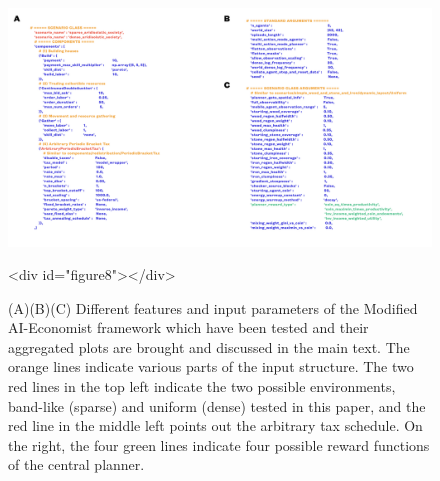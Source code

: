 \documentclass{article}
\begin{document}
\newpage

\begin{figure}[h!]
\centering
\includegraphics[width=0.7\linewidth]{"A_Multi-agent_Reinforcement_Learning_Study_of_Emergence_of_Social_Classes_out_of_Arbitrary_Governance_The_Role_of_Environment_Slides_1/A_Multi-agent_Reinforcement_Learning_Study_of_Emergence_of_Social_Classes_out_of_Arbitrary_Governance_The_Role_of_Environment_Slides_1.003"}
\caption{(A)(B)(C) Different features and input parameters of the Modified AI-Economist framework which have been tested and their aggregated plots are brought and discussed in the main text. The orange lines indicate various parts of the input structure. The two red lines in the top left indicate the two possible environments, band-like (sparse) and uniform (dense) tested in this paper, and the red line in the middle left points out the arbitrary tax schedule. On the right, the four green lines indicate four possible reward functions of the central planner.}
<div id="figure8"></div>

\end{figure}

\newpage
\end{document}
